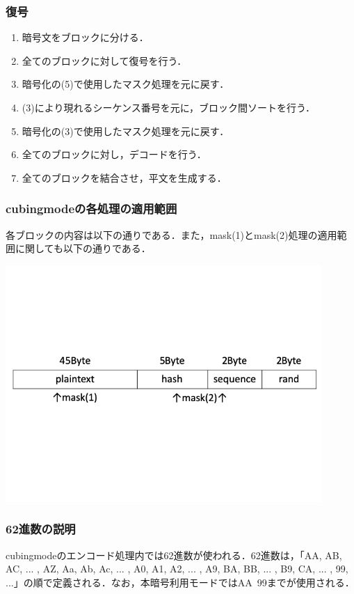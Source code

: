\documentclass{jsarticle}
\begin{document}
\subsubsection{復号}
\begin{enumerate}
\item 暗号文をブロックに分ける．
\item 全てのブロックに対して復号を行う．
\item 暗号化の(5)で使用したマスク処理を元に戻す．
\item (3)により現れるシーケンス番号を元に，ブロック間ソートを行う．
\item 暗号化の(3)で使用したマスク処理を元に戻す．
\item 全てのブロックに対し，デコードを行う．
\item 全てのブロックを結合させ，平文を生成する．
\end{enumerate}

\subsubsection{cubingmodeの各処理の適用範囲}
各ブロックの内容は以下の通りである．また，mask(1)とmask(2)処理の適用範囲に関しても以下の通りである．
\begin{center}
  \includegraphics[width=12cm]{./tex_pic/block.png}\\
\end{center}

\subsubsection{62進数の説明}
cubingmodeのエンコード処理内では62進数が使われる．62進数は，「AA, AB, AC, ... , AZ, Aa, Ab, Ac, ... , A0, A1, A2, ... , A9, BA, BB, ... , B9, CA, ... , 99, ...」の順で定義される．なお，本暗号利用モードではAA~99までが使用される．
\end{document}
